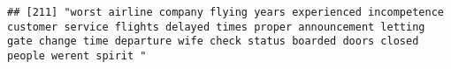 \documentclass[
]{article}
\begin{document}
\begin{verbatim}
## [211] "worst airline company flying years experienced incompetence customer service flights delayed times proper announcement letting gate change time departure wife check status boarded doors closed people werent spirit "                                                                                                                                                                                                                                                                                                                                                                                                                                                                                                                                                                                                                                                                                                                                                                                                                                                                                                                                                                                                                                                                                                                                                                                                                                                                                                                                                                                                                                                                                                                                                                        

\end{verbatim}
\end{document}
